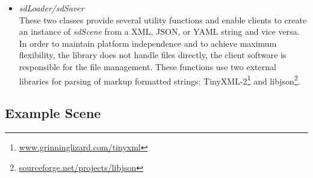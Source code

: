 \documentclass{article}
\begin{document}
\begin{itemize}[leftmargin=-0.0mm]
\item[] \emph{sdLoader/sdSaver}\\
These two classes provide several utility functions and enable clients to create an instance of \emph{sdScene} from a XML, JSON, or YAML string and vice versa. 
In order to maintain platform independence and to achieve maximum flexibility, the library does not handle files directly, the client software is responsible for the file management. 
These functions use two external libraries for parsing of markup formatted strings: TinyXML-2\footnote{\href{http://www.grinninglizard.com/tinyxml}{www.grinninglizard.com/tinyxml} } and libjson\footnote{\href{http://sourceforge.net/projects/libjson}{sourceforge.net/projects/libjson} }.
\end{itemize}

% 
%  
% 
%  
% 
% 
% 
% 
% 
% 

\subsection{Example Scene}\label{example_scene}
\end{document}
